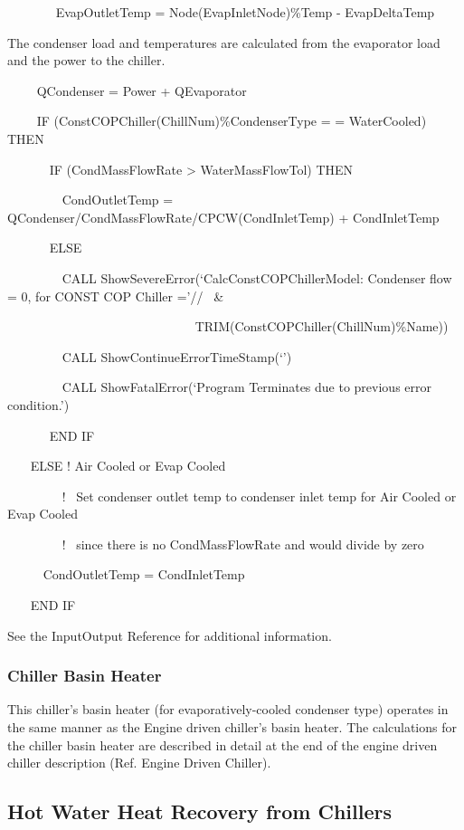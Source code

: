 ~~~~~~~ EvapOutletTemp = Node(EvapInletNode)\%Temp - EvapDeltaTemp

The condenser load and temperatures are calculated from the evaporator load and the power to the chiller.

~~~~ QCondenser = Power + QEvaporator

~~~~ IF (ConstCOPChiller(ChillNum)\%CondenserType = = WaterCooled) THEN

~~~~~~ IF (CondMassFlowRate \textgreater{} WaterMassFlowTol) THEN

~~~~~~~~ CondOutletTemp = QCondenser/CondMassFlowRate/CPCW(CondInletTemp) + CondInletTemp

~~~~~~ ELSE

~~~~~~~~ CALL ShowSevereError(`CalcConstCOPChillerModel: Condenser flow = 0, for CONST COP Chiller ='//~ \&

~~~~~~ ~~~~~~~~~~~~~~~~~~~~~~~TRIM(ConstCOPChiller(ChillNum)\%Name))

~~~~~~~~ CALL ShowContinueErrorTimeStamp(`')

~~~~~~~~ CALL ShowFatalError(`Program Terminates due to previous error condition.')

~~~~~~ END IF

~~~ ELSE ! Air Cooled or Evap Cooled

~~~~~~~~ !~ Set condenser outlet temp to condenser inlet temp for Air Cooled or Evap Cooled

~~~~~~~~ !~ since there is no CondMassFlowRate and would divide by zero

~~~~~ CondOutletTemp = CondInletTemp

~~~ END IF

See the InputOutput Reference for additional information.

\subsubsection{Chiller Basin Heater}\label{chiller-basin-heater-1}

This chiller's basin heater (for evaporatively-cooled condenser type) operates in the same manner as the Engine driven chiller's basin heater. The calculations for the chiller basin heater are described in detail at the end of the engine driven chiller description (Ref. Engine Driven Chiller).

\subsection{Hot Water Heat Recovery from Chillers}\label{hot-water-heat-recovery-from-chillers}

